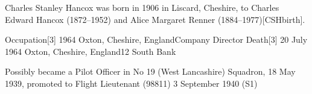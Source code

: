 Charles Stanley Hancox was born in 1906 in Liscard, Cheshire, to Charles Edward Hancox (1872--1952) and Alice Margaret Renner (1884--1977)[CSHbirth].

Occupation[3] 	1964 	Oxton, Cheshire, EnglandCompany Director
Death[3] 	20 July 1964 	Oxton, Cheshire, England12 South Bank

Possibly became a Pilot Officer in No 19 (West Lancashire) Squadron, 18 May 1939, promoted to Flight Lieutenant (98811) 3 September 1940 (S1)

